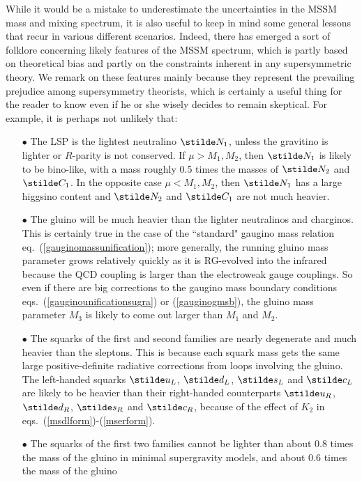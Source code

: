 While it would be a mistake to underestimate the uncertainties in
the MSSM mass and mixing spectrum, it is also useful to keep in mind
some general lessons that recur in various different scenarios.
Indeed, there has emerged a sort of folklore concerning likely
features of the MSSM spectrum, which is partly based on theoretical
bias and partly on the constraints inherent in any supersymmetric
theory. We remark on these features mainly because they represent
the prevailing prejudice among supersymmetry theorists, which is
certainly a useful thing for the reader to know even if
he or she wisely decides to remain skeptical.
For example, it is perhaps not unlikely that:
\begin{itemize}
\item[$\bullet$] The LSP is the lightest neutralino $\stilde N_1$, unless
the gravitino is
lighter or $R$-parity is not conserved. If $\mu > M_1, M_2$,
then $\stilde N_1$ is likely to be bino-like, with a mass roughly
0.5 times the masses of $\stilde N_2$ and $\stilde C_1$.
In the opposite case $\mu < M_1,M_2$, then $\stilde N_1$ has a large
higgsino content and $\stilde N_2$ and $\stilde C_1$ are not much heavier.
\item[$\bullet$] The gluino will be much heavier than the lighter
neutralinos and charginos. This is certainly true in the case
of the ``standard" gaugino mass relation eq.~(\ref{gauginomassunification});
more
generally,
the running gluino mass parameter grows relatively quickly as it is
RG-evolved into
the infrared because the QCD coupling is larger than the electroweak
gauge couplings. So
even if there are
big corrections to
the gaugino mass boundary conditions eqs.~(\ref{gauginounificationsugra})
or (\ref{gauginogmsb}), the gluino mass parameter $M_3$ is likely to come
out larger than $M_1$ and $M_2$.
\item[$\bullet$] The squarks of the first and second families are
nearly degenerate and much
heavier than the sleptons. This is because each squark mass gets the same
large positive-definite
radiative corrections from loops involving the gluino.
The left-handed squarks $\stilde u_L$, $\stilde d_L$, $\stilde s_L$
and $\stilde c_L$ are likely to be heavier than their right-handed
counterparts $\stilde u_R$, $\stilde d_R$, $\stilde s_R$
and $\stilde c_R$,  because of the effect of $K_2$ in
eqs.~(\ref{msdlform})-(\ref{mserform}).
\item[$\bullet$] The squarks of the first two families cannot be
lighter than about 0.8 times the mass of the gluino in minimal
supergravity models, and about 0.6 times the mass of the gluino

\end{itemize}
